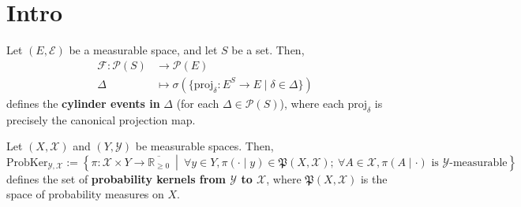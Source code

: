 %

\chapter{Intro}

\begin{definition}
    \label{def:cylinder-event}
    \leanok
    Let $(E,\mathcal{E})$ be a measurable space, and let $S$ be a set. Then,
    \begin{align*}
        \mathcal{F}:\mathcal{P}(S)&\to\mathcal{P}(E)\\
        \Delta&\mapsto \sigma(\{\text{proj}_\delta:E^S\to E\mid \delta\in \Delta\})
    \end{align*}
    defines the \textbf{cylinder events in }$\Delta$ (for each $\Delta\in\mathcal{P}(S)$), where each $\text{proj}_\delta$ is precisely the canonical projection map.
\end{definition}

\begin{definition}
    \label{def:kernel}
    \leanok
    Let $(X,\mathcal{X})$ and $(Y,\mathcal{Y})$ be measurable spaces. Then,
    \begin{equation*}
        \text{ProbKer}_{\mathcal{Y},\mathcal{X}}:=\left\{\pi:\mathcal{X}\times Y\to\overline{\mathbb{R}_{\geq0}}~\middle\vert~ \forall y\in Y,\pi(\cdot\mid y)\in\mathfrak{P}(X,\mathcal{X});~\forall A\in\mathcal{X},\pi(A\mid\cdot)\text{ is }\mathcal{Y}\text{-measurable}\right\}
    \end{equation*}
    defines the set of \textbf{probability kernels from $\mathcal{Y}$ to $\mathcal{X}$}, where $\mathfrak{P}(X,\mathcal{X})$ is the space of probability measures on $X$.
\end{definition}

